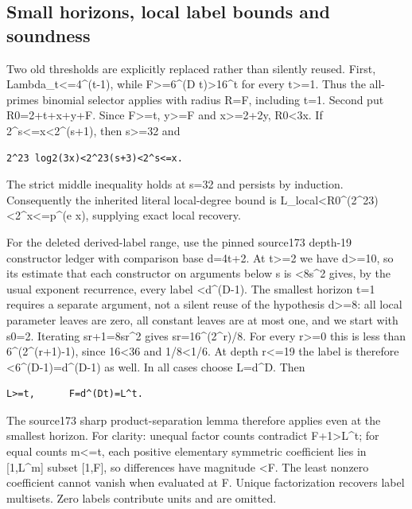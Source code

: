 \subsection{Small horizons, local label bounds and
soundness}\label{small-horizons-local-label-bounds-and-soundness}

Two old thresholds are explicitly replaced rather than silently reused.
First, Lambda\_t\textless=4\^{}(t-1), while F\textgreater=6\^{}(D
t)\textgreater16\^{}t for every t\textgreater=1. Thus the all-primes
binomial selector applies with radius R=F, including t=1. Second put
R0=2+t+x+y+F. Since F\textgreater=t, y\textgreater=F and
x\textgreater=2+2y, R0\textless3x. If
2\^{}s\textless=x\textless2\^{}(s+1), then s\textgreater=32 and

\begin{verbatim}
2^23 log2(3x)<2^23(s+3)<2^s<=x.
\end{verbatim}

The strict middle inequality holds at s=32 and persists by induction.
Consequently the inherited literal local-degree bound is
L\_local\textless R0\^{}(2\^{}23)\textless2\^{}x\textless=p\^{}(e x),
supplying exact local recovery.

For the deleted derived-label range, use the pinned source173 depth-19
constructor ledger with comparison base d=4t+2. At t\textgreater=2 we
have d\textgreater=10, so its estimate that each constructor on
arguments below s is \textless8s\^{}2 gives, by the usual exponent
recurrence, every label \textless d\^{}(D-1). The smallest horizon t=1
requires a separate argument, not a silent reuse of the hypothesis
d\textgreater=8: all local parameter leaves are zero, all constant
leaves are at most one, and we start with s0=2. Iterating sr+1=8sr\^{}2
gives sr=16\^{}(2\^{}r)/8. For every r\textgreater=0 this is less than
6\^{}(2\^{}(r+1)-1), since 16\textless36 and 1/8\textless1/6. At depth
r\textless=19 the label is therefore \textless6\^{}(D-1)=d\^{}(D-1) as
well. In all cases choose L=d\^{}D. Then

\begin{verbatim}
L>=t,      F=d^(Dt)=L^t.
\end{verbatim}

The source173 sharp product-separation lemma therefore applies even at
the smallest horizon. For clarity: unequal factor counts contradict
F+1\textgreater L\^{}t; for equal counts m\textless=t, each positive
elementary symmetric coefficient lies in {[}1,L\^{}m{]} subset
{[}1,F{]}, so differences have magnitude \textless F. The least nonzero
coefficient cannot vanish when evaluated at F. Unique factorization
recovers label multisets. Zero labels contribute units and are omitted.

